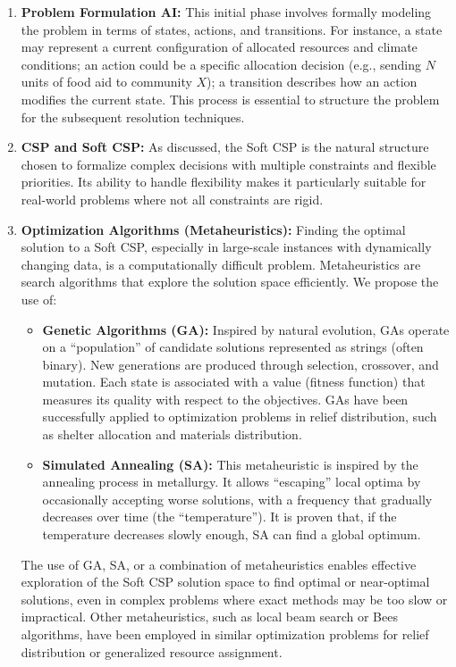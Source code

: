 \documentclass[letterpaper]{article}
\begin{document}
\begin{enumerate}
    \item \textbf{Problem Formulation AI:} This initial phase involves formally modeling the problem in terms of states, actions, and transitions. For instance, a state may represent a current configuration of allocated resources and climate conditions; an action could be a specific allocation decision (e.g., sending $N$ units of food aid to community $X$); a transition describes how an action modifies the current state. This process is essential to structure the problem for the subsequent resolution techniques.

    \item \textbf{CSP and Soft CSP:} As discussed, the Soft CSP is the natural structure chosen to formalize complex decisions with multiple constraints and flexible priorities. Its ability to handle flexibility makes it particularly suitable for real-world problems where not all constraints are rigid.

    \item \textbf{Optimization Algorithms (Metaheuristics):} Finding the optimal solution to a Soft CSP, especially in large-scale instances with dynamically changing data, is a computationally difficult problem. Metaheuristics are search algorithms that explore the solution space efficiently. We propose the use of:
          \begin{itemize}
              \item \textbf{Genetic Algorithms (GA):} Inspired by natural evolution, GAs operate on a “population” of candidate solutions represented as strings (often binary). New generations are produced through selection, crossover, and mutation. Each state is associated with a value (fitness function) that measures its quality with respect to the objectives. GAs have been successfully applied to optimization problems in relief distribution, such as shelter allocation and materials distribution.
              \item \textbf{Simulated Annealing (SA):} This metaheuristic is inspired by the annealing process in metallurgy. It allows “escaping” local optima by occasionally accepting worse solutions, with a frequency that gradually decreases over time (the “temperature”). It is proven that, if the temperature decreases slowly enough, SA can find a global optimum.
          \end{itemize}
          The use of GA, SA, or a combination of metaheuristics enables effective exploration of the Soft CSP solution space to find optimal or near-optimal solutions, even in complex problems where exact methods may be too slow or impractical. Other metaheuristics, such as local beam search or Bees algorithms, have been employed in similar optimization problems for relief distribution or generalized resource assignment.


\end{enumerate}
\end{document}
